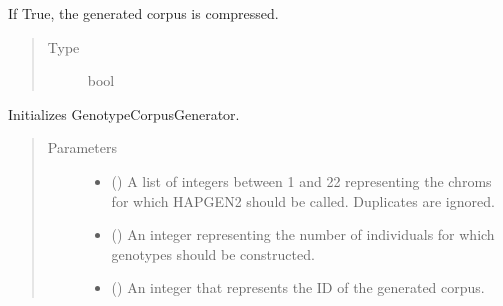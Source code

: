 \documentclass[a4paper,10pt,english]{sphinxhowto}
\begin{document}
\begin{fulllineitems}
\begin{fulllineitems}
\end{fulllineitems}


\begin{fulllineitems}
\label{\detokenize{utils:utils.genotype_corpus_generator.GenotypeCorpusGenerator.compress}}
If True, the generated corpus is compressed.
\begin{quote}\begin{description}
\item[{Type}] \leavevmode
bool

\end{description}\end{quote}

\end{fulllineitems}


\begin{fulllineitems}
\label{\detokenize{utils:utils.genotype_corpus_generator.GenotypeCorpusGenerator.__init__}}
Initializes GenotypeCorpusGenerator.
\begin{quote}\begin{description}
\item[{Parameters}] \leavevmode\begin{itemize}
\item {} 
 () \textendash{} A list of integers between 1 and 22 representing the chroms for which
HAPGEN2 should be called. Duplicates are ignored.

\item {} 
 () \textendash{} An integer representing the number of individuals for which genotypes should
be constructed.

\item {} 
 () \textendash{} An integer that represents the ID of the generated corpus.


\end{itemize}
\end{description}
\end{quote}
\end{fulllineitems}
\end{fulllineitems}
\end{document}
